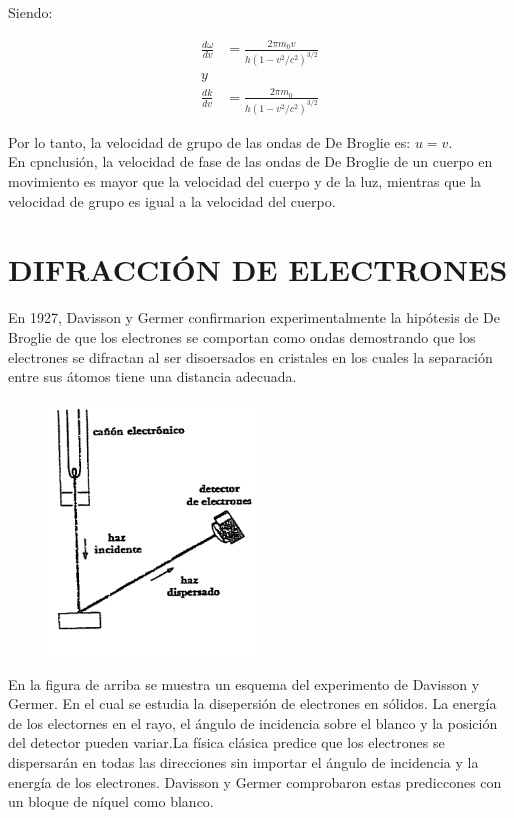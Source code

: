 \documentclass[a4paper]{article}
\begin{document}
    \indent Siendo:

    \begin{align}
        \frac{d\omega}{dv} &= \frac{2 \pi m_0 v}{h(1-v^2/c^2)^{3/2}} \tag*{} \\[10pt]
        y\\[10pt]
        \frac{dk}{dv} &= \frac{2 \pi m_0}{h(1-v^2/c^2)^{3/2}} \tag*{}
    \end{align}

    \indent Por lo tanto, la velocidad de grupo de las ondas de De Broglie es: $u=v$.\\

    \indent En cpnclusión, la velocidad de fase de las ondas de De Broglie de un cuerpo en movimiento es mayor que la velocidad del cuerpo y de la luz, mientras que la velocidad de grupo es igual a la velocidad del cuerpo.\\

\section{DIFRACCIÓN DE ELECTRONES}

    \indent En 1927, Davisson y Germer confirmarion experimentalmente la hipótesis de De Broglie de que los electrones se comportan como ondas demostrando que los electrones se difractan al ser disoersados en cristales en los cuales la separación entre sus átomos tiene una distancia adecuada.\\

    \begin{figure}[h!]
        \centering
        \includegraphics[width = 5.5cm]{../Experimento.png}
    \end{figure}

    \indent En la figura de arriba se muestra un esquema del experimento de Davisson y Germer. En el cual se estudia la disepersión de electrones en sólidos. La energía de los electornes en el rayo, el ángulo de incidencia sobre el blanco y la posición del detector pueden variar.La física clásica predice que los electrones se dispersarán en todas las direcciones sin importar el ángulo de incidencia y la energía de los electrones. Davisson y Germer comprobaron estas prediccones con un bloque de níquel como blanco.\\
\end{document}
